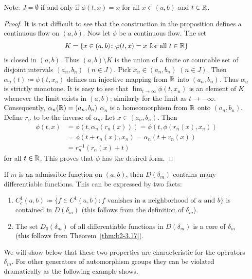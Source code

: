 Note: $J = \emptyset$ if and only if\/ $\phi(t,x) = x$ for all $x \in (a,b)$ and $t \in \mathbb{R}$.
\begin{proof}
It is not difficult to see that the construction in the proposition defines a continuous flow on $(a,b)$.
Now let $\phi$ be a continuous flow.
The set 
\[
K = \{ x \in (a,b) \colon \phi(t,x) = x \text{ for all } t \in \R \} 
\]
is closed in $(a,b)$.
Thus $(a,b) \setminus K$ is the union of a finite or countable set of disjoint intervals $(a_{n},b_{n})$ $(n \in J)$.
Pick $x_{n} \in (a_{n},b_{n})$ $(n \in J)$.
Then $\alpha_{n}(t) \coloneq \phi(t,x_{n})$ defines an injective mapping from $\mathbb{R}$ into $(a_{n},b_{n})$.
Thus $\alpha_{n}$ is strictly monotone.
It is easy to see that $\lim_{t \to \infty} \phi(t,x_{n})$ is an element of\/ $K$ whenever the limit exists in $(a,b)$; similarly for the limit as $t \to -\infty$.
Consequently, $\alpha_{n}(\mathbb{R}) = (a_{n},b_{n})$ \ie  $\alpha_{n}$ is a homeomorphism from $\mathbb{R}$ onto $(a_{n},b_{n})$.
Define $r_{n}$ to be the inverse of\/ $\alpha_{n}$.
Let $x \in (a_{n},b_{n})$.
Then 
\begin{align*}
\phi(t,x) &= \phi(t, \alpha_{n}(r_{n}(x))) = \phi(t, \phi(r_{n}(x),x_{n})) \\
          &= \phi(t + r_{n}(x),x_{n}) = \alpha_{n}(t + r_{n}(x)) \\
          &= r_{n}^{-1}(r_{n}(x) + t)	
\end{align*}
for all $t \in \mathbb{R}$.
This proves that $\phi$ has the desired form.
\end{proof}
If\/ $m$ is an admissible function on $(a,b)$, then $D(\delta_{m})$ contains many differentiable functions.
This can be expressed by two facts:
\begin{enumerate}[\upshape (i)]
\item \label{enum:b2-3-1.1}
$C_{c}^{1}(a,b) \coloneq \{ f \in C^{1}(a,b) \colon f \text{ vanishes in a neighborhood of } a \text{ and } b\}$
is contained in $D(\delta_{m})$ (this follows from the definition of\/ $\delta_{m}$).

\item  \label{enum:b2-3-1.2}
The set $D_{0}(\delta_{m})$ of all differentiable functions in $D(\delta_{m})$ is a core of\/ $\delta_{m}$ (this follows from Theorem~\ref{thm:b2-3.17}).
\end{enumerate}
We will show below that these two properties are characteristic for the operators $\delta_{m}$.
For other generators of automorphism groups they can be violated dramatically as the following example shows.
